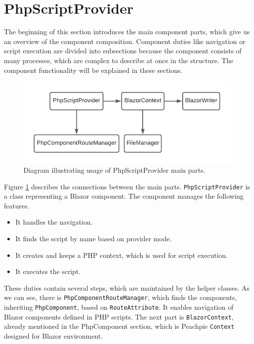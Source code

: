 \section{PhpScriptProvider}

The beginning of this section introduces the main component parts, which give us an overview of the component composition.
Component duties like navigation or script execution are divided into subsections because the component consists of many processes, which are complex to describe at once in the structure.
The component functionality will be explained in these sections.
\par
\begin{figure}[b!]
\centering
\includegraphics[scale=0.8]{./img/PhpScriptProvider}
\caption{Diagram illustrating usage of PhpScriptProvider main parts.}
\label{img18:provider}
\end{figure}
\par
Figure \ref{img18:provider} describes the connections between the main parts.
\texttt{PhpScript\-Provider} is a class representing a Blazor component.
The component manages the following features.
\par
\begin{itemize}
\item It handles the navigation.
\item It finds the script by name based on provider mode.
\item It creates and keeps a PHP context, which is used for script execution.
\item It executes the script.
\end{itemize}
\par
These duties contain several steps, which are maintained by the helper classes.
As we can see, there is \texttt{PhpComponentRouteManager}, which finds the components, inheriting \texttt{PhpComponent}, based on \texttt{RouteAttribute}.
It enables navigation of Blazor components defined in PHP scripts.
The next part is \texttt{BlazorContext}, already mentioned in the PhpComponent section, which is Peachpie \texttt{Context} designed for Blazor environment.

